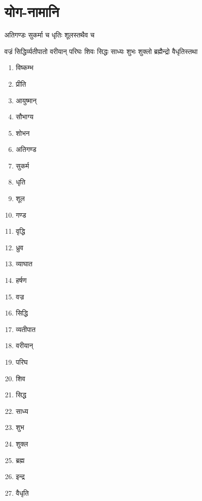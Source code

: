 \section{योग-नामानि}
\label{app:yoga_names}
{अतिगण्डः सुकर्मा च धृतिः शूलस्तथैव च}

{वज्रं सिद्धिर्व्यतीपातो वरीयान् परिघः शिवः}
{सिद्धः साध्यः शुभः शुक्लो ब्रह्मैन्द्रो वैधृतिस्तथा}

\begin{multicols}{2}
\begin{enumerate}
\item विष्कम्भ
\item प्रीति
\item आयुष्मान्
\item सौभाग्य
\item शोभन
\item अतिगण्ड
\item सुकर्म
\item धृति
\item शूल
\item गण्ड
\item वृद्धि
\item ध्रुव
\item व्याघात
\item हर्षण
\item वज्र
\item सिद्धि
\item व्यतीपात
\item वरीयान्
\item परिघ
\item शिव
\item सिद्ध
\item साध्य
\item शुभ
\item शुक्ल
\item ब्रह्म
\item इन्द्र
\item वैधृति
\end{enumerate}
\end{multicols}